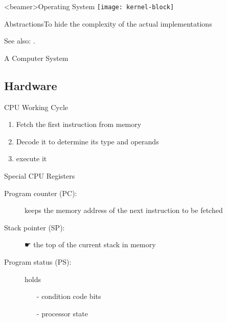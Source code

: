 \begin{frame}<beamer>{Operating System}
  \centering
  \texttt{[image: kernel-block]}
\end{frame}

\begin{frame}{Abstractions}{To hide the complexity of the actual implementations}
  \begin{center}
  \end{center}
\end{frame}

See also: .

\begin{frame}{A Computer System}
  \begin{center}
  \end{center}
\end{frame}

\subsection{Hardware}
\label{sec:cpu}

\begin{frame}{CPU Working Cycle}
  \begin{center}
  \end{center}
  \begin{enumerate}
  \item Fetch the first instruction from memory
  \item Decode it to determine its type and operands
  \item execute it
  \end{enumerate}
  \begin{block}{Special CPU Registers}
    \begin{description}
    \item[Program counter (PC):] keeps the memory address of the next instruction to
      be fetched
    \item[Stack pointer (SP):] {\symbola ☛} the top of the current stack in memory
    \item[Program status (PS):] holds
      \begin{itemize}
      \item[-] condition code bits
      \item[-] processor state
      \end{itemize}
    \end{description}
  \end{block}
\end{frame}

